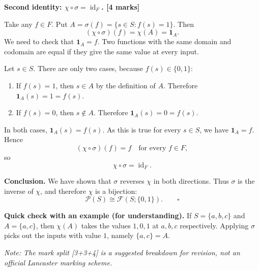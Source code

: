 \documentclass[11pt,a4paper]{article}
\begin{document}
\textbf{Second identity: $\chi\circ\sigma=\operatorname{id}_F$. \hfill [4 marks]}

Take any $f\in F$. Put $A=\sigma(f)=\{s\in S:f(s)=1\}$.
Then
\[
(\chi\circ\sigma)(f)=\chi(A)=\mathbf 1_A.
\]
We need to check that $\mathbf 1_A=f$. Two functions with the same domain and codomain are equal if they give the same value at every input.

Let $s\in S$. There are only two cases, because $f(s)\in\{0,1\}$:
\begin{enumerate}[label=\textbf{Case \arabic*:},leftmargin=*,itemsep=1pt]
\item If $f(s)=1$, then $s\in A$ by the definition of $A$. Therefore $\mathbf 1_A(s)=1=f(s)$.
\item If $f(s)=0$, then $s\notin A$. Therefore $\mathbf 1_A(s)=0=f(s)$.
\end{enumerate}
In both cases, $\mathbf 1_A(s)=f(s)$. As this is true for every $s\in S$, we have $\mathbf 1_A=f$. Hence
\[
(\chi\circ\sigma)(f)=f
\quad\text{for every }f\in F,
\]
so
\[
\boxed{\chi\circ\sigma=\operatorname{id}_F.}
\]

\textbf{Conclusion.} We have shown that $\sigma$ reverses $\chi$ in both directions. Thus $\sigma$ is the inverse of $\chi$, and therefore $\chi$ is a bijection:
\[
\boxed{\mathcal P(S)\cong\mathcal F(S;\{0,1\}).}\qquad\square
\]

\textbf{Quick check with an example (for understanding).} If $S=\{a,b,c\}$ and $A=\{a,c\}$, then $\chi(A)$ takes the values $1,0,1$ at $a,b,c$ respectively. Applying $\sigma$ picks out the inputs with value $1$, namely $\{a,c\}=A$.

\vspace{0.3em}
{\small\emph{Note: The mark split [3+3+4] is a suggested breakdown for revision, not an official Lancaster marking scheme.}}
\end{document}
